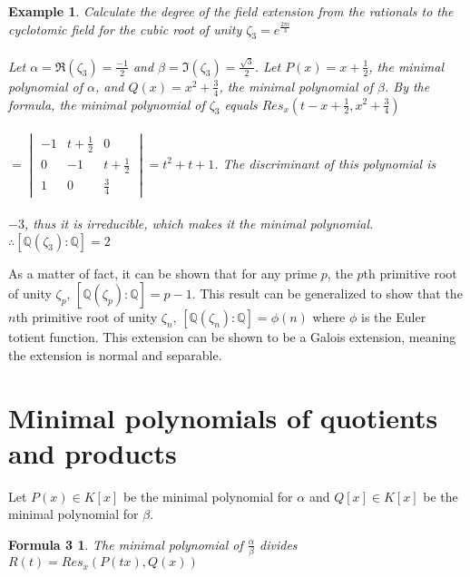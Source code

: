 \documentclass{article}
\newtheorem*{Definition: Sylvester Matrix}{Definition}
\newtheorem*{Definition: Resultant 1}{Definition 1}
\newtheorem*{Definition: Resultant 2}{Definition 2}
\newtheorem*{Theorem: Resultant proves shared roots}{Theorem 1}
\newtheorem*{Theorem: Minimal polynomial for beta}{Theorem 2}
\newtheorem*{Example: Sylvester Matrix Ex}{Example}
\newtheorem*{Theorem: Roots}{Theorem}
\newtheorem*{Corollary: Discriminant}{Corollary}
\newtheorem*{Theorem: Rational Root Theorem}{Theorem}
\newtheorem*{Corollary: Cubic Irreducibility}{Corollary}
\newtheorem*{Theorem: Eisenstein Criterion}{Theorem}
\newtheorem*{Theorem: mod p Test}{Theorem}
\newtheorem*{Theorem: Rabin's algorithm}{Theorem}
\newtheorem*{Theorem: gcd finite field}{Theorem}
\newtheorem*{Theorem: Gauss Irreducibles}{Theorem}
\newtheorem*{Theorem: Number of irreducibles}{Theorem}
\newtheorem*{Example: All irreducibles in Z_2}{Example}
\newtheorem*{Formula: Minimal polynomial for r root of a}{Formula 1}
\newtheorem*{Example: minimal polynomial for sqrt(p)}{Example}
\newtheorem*{Example: Golden Ratio}{Example}
\newtheorem*{Formula: Minimal polynomial for a+b}{Formula 2}
\newtheorem*{Example: 1 + sqrt(3)}{Example}
\newtheorem*{Example: cubic root of unity}{Example}
\newtheorem*{Formula: Minimal polynomial for a/b}{Formula 3}
\newtheorem*{Formula: Minimal polynomial for ab}{Formula 4}
\newtheorem*{Example: cubrt(4)/i+1}{Example}
\newtheorem*{Example: 5zeta}{Example}
\newtheorem*{Example: Wild one}{Example}
\begin{document}
\begin{Example: cubic root of unity}
Calculate the degree of the field extension from the rationals to the cyclotomic field for the cubic root of unity $\zeta_3 = e^{\frac{2 \pi i}{3}}$ \\\\
Let $\alpha = \Re(\zeta_3) = \frac{-1}{2}$ and $\beta = \Im(\zeta_3) = \frac{\sqrt{3}}{2}$. Let $P(x) = x+\frac{1}{2}$, the minimal polynomial of $\alpha$, and $Q(x) = x^2 + \frac{3}{4}$, the minimal polynomial of $\beta$. By the formula, the minimal polynomial of $\zeta_3$ equals $Res_x(t-x+\frac{1}{2}, x^2 + \frac{3}{4})$ \\\\
$= \begin{vmatrix} -1 & t + \frac{1}{2} & 0 \\ 0 & -1 & t+\frac{1}{2} \\ 1 & 0 & \frac{3}{4} \end{vmatrix} = t^2 + t + 1$. The discriminant of this polynomial is\\\\
 $-3$, thus it is irreducible, which makes it the minimal polynomial.\\
$\therefore [\mathbb{Q}(\zeta_3) : \mathbb{Q}] = 2$\\
\end{Example: cubic root of unity}

As a matter of fact, it can be shown that for any prime $p$, the $p$th primitive root  of unity $\zeta_p$, $[\mathbb{Q}(\zeta_p) : \mathbb{Q}] = p-1$. This result can be generalized to show that the $n$th primitive root  of unity $\zeta_n$, $[\mathbb{Q}(\zeta_n) : \mathbb{Q}] = \phi(n)$ where $\phi$ is the Euler totient function. This extension can be shown to be a Galois extension, meaning the extension is normal and separable.\\

\section{Minimal polynomials of quotients and products}

Let $P(x) \in K[x]$ be the minimal polynomial for $\alpha$ and $Q[x]\in K[x]$ be the minimal polynomial for $\beta$.\\

\begin{Formula: Minimal polynomial for a/b}
The minimal polynomial of $\frac{\alpha}{\beta}$ divides $R(t) = Res_x(P(tx), Q(x))$
\end{Formula: Minimal polynomial for a/b}
\end{document}
